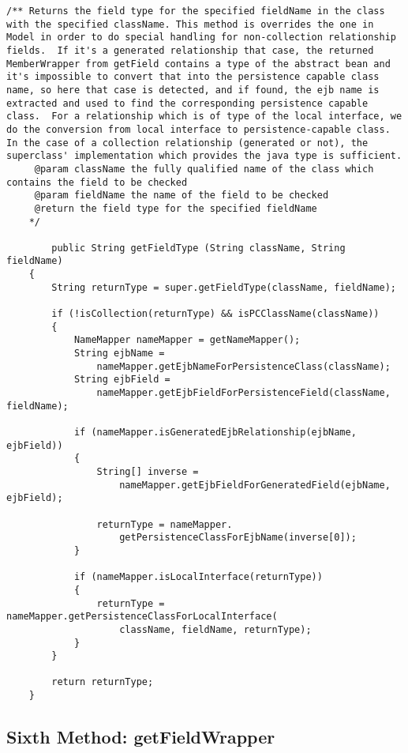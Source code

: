 \begin{lstlisting}
/** Returns the field type for the specified fieldName in the class with the specified className. This method is overrides the one in Model in order to do special handling for non-collection relationship fields.  If it's a generated relationship that case, the returned MemberWrapper from getField contains a type of the abstract bean and it's impossible to convert that into the persistence capable class name, so here that case is detected, and if found, the ejb name is extracted and used to find the corresponding persistence capable class.  For a relationship which is of type of the local interface, we do the conversion from local interface to persistence-capable class.  In the case of a collection relationship (generated or not), the superclass' implementation which provides the java type is sufficient.
	 @param className the fully qualified name of the class which contains the field to be checked
	 @param fieldName the name of the field to be checked
	 @return the field type for the specified fieldName
	*/

		public String getFieldType (String className, String fieldName)
	{
		String returnType = super.getFieldType(className, fieldName);

		if (!isCollection(returnType) && isPCClassName(className))
		{
			NameMapper nameMapper = getNameMapper();
			String ejbName = 
				nameMapper.getEjbNameForPersistenceClass(className);
			String ejbField = 
				nameMapper.getEjbFieldForPersistenceField(className, fieldName);

			if (nameMapper.isGeneratedEjbRelationship(ejbName, ejbField))
			{
				String[] inverse = 
					nameMapper.getEjbFieldForGeneratedField(ejbName, ejbField);
            
				returnType = nameMapper.
					getPersistenceClassForEjbName(inverse[0]);
			}

			if (nameMapper.isLocalInterface(returnType))
			{
				returnType = nameMapper.getPersistenceClassForLocalInterface(
					className, fieldName, returnType);
			}
		}

		return returnType;
	}
\end{lstlisting}

\newpage
\subsection{Sixth Method: getFieldWrapper}

